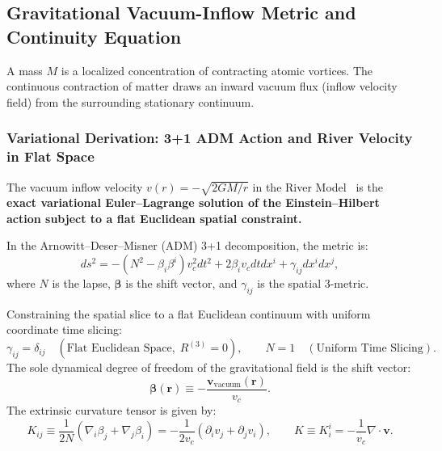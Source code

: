 \subsection{Gravitational Vacuum-Inflow Metric and Continuity Equation}
A mass $M$ is a localized concentration of contracting atomic vortices. The continuous contraction of matter draws an inward vacuum flux (inflow velocity field) from the surrounding stationary continuum.

\subsubsection{Variational Derivation: 3+1 ADM Action and River Velocity in Flat Space}
\label{sec:adm_eylem_turetilis}
The vacuum inflow velocity $v(r) = -\sqrt{2GM/r}$ in the River Model~\cite{hamilton2008} is the \textbf{exact variational Euler--Lagrange solution of the Einstein--Hilbert action subject to a flat Euclidean spatial constraint.}

In the Arnowitt--Deser--Misner (ADM) 3+1 decomposition, the metric is:
\begin{equation}
    ds^2 = -\left(N^2 - \beta_i \beta^i\right) v_c^2 dt^2 + 2 \beta_i v_c dt dx^i + \gamma_{ij} dx^i dx^j,
    \label{eq:adm_metrik_ayrisim}
\end{equation}
where $N$ is the lapse, $\boldsymbol{\beta}$ is the shift vector, and $\gamma_{ij}$ is the spatial 3-metric.

Constraining the spatial slice to a flat Euclidean continuum with uniform coordinate time slicing:
\begin{equation}
    \gamma_{ij} = \delta_{ij} \quad (\text{Flat Euclidean Space}, \; R^{(3)} = 0), \qquad N = 1 \quad (\text{Uniform Time Slicing}).
    \label{eq:duz_uzay_kisit}
\end{equation}
The sole dynamical degree of freedom of the gravitational field is the shift vector:
\begin{equation}
    \boldsymbol{\beta}(\mathbf{r}) \equiv -\frac{\mathbf{v}_{\mathrm{vacuum}}(\mathbf{r})}{v_c}.
    \label{eq:shift_vektor_tanim}
\end{equation}
The extrinsic curvature tensor is given by:
\begin{equation}
    K_{ij} \equiv \frac{1}{2N} \left( \nabla_i \beta_j + \nabla_j \beta_i \right) = -\frac{1}{2 v_c} \left( \partial_i v_j + \partial_j v_i \right), \qquad K \equiv K^i_i = -\frac{1}{v_c} \nabla \cdot \mathbf{v}.
    \label{eq:dissal_egrilik_shift}
\end{equation}

